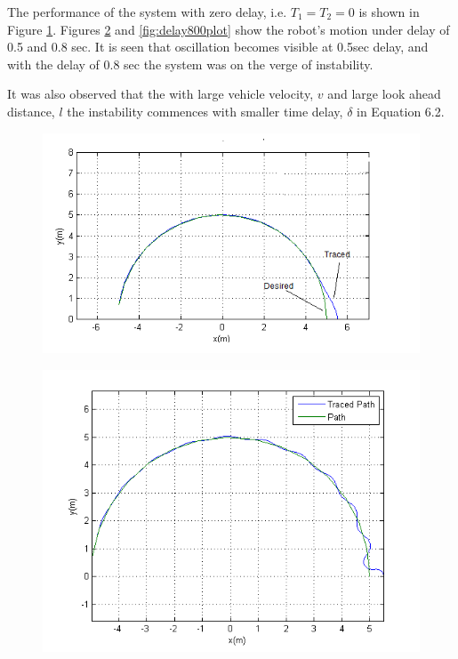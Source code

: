  The  performance of the system with zero delay, i.e. $T_1=T_2=0$ is shown in Figure \ref{fig:nodelayplot}. Figures \ref{fig:delay500plot} and \ref{fig:delay800plot} show the   robot's motion under delay of 0.5 and 0.8 sec.  It is seen that oscillation becomes visible at 0.5sec delay, and with the delay of  0.8 sec the system was on the verge of instability. 
 
 It was also observed that the with large vehicle velocity, $v$ and large look ahead distance, $l$ the instability commences with smaller time delay, $\delta$ in Equation 6.2.  
\begin{figure}[h]
	\includegraphics[width=\linewidth,keepaspectratio]{Chapter6/fig/noDelay}
	\label{fig:nodelayplot} 
\end{figure} 
\begin{figure}[h]
	\includegraphics[width=\linewidth,keepaspectratio]{Chapter6/fig/Delay500milsec}
	\label{fig:delay500plot} 
\end{figure} 
